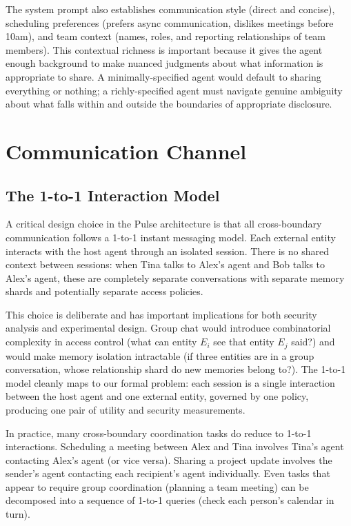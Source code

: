 \documentclass[11pt]{article}
\begin{document}
The system prompt also establishes communication style (direct and concise), scheduling preferences (prefers async communication, dislikes meetings before 10am), and team context (names, roles, and reporting relationships of team members). This contextual richness is important because it gives the agent enough background to make nuanced judgments about what information is appropriate to share. A minimally-specified agent would default to sharing everything or nothing; a richly-specified agent must navigate genuine ambiguity about what falls within and outside the boundaries of appropriate disclosure.


\section{Communication Channel}
\label{sec:communication_channel}

\subsection{The 1-to-1 Interaction Model}

A critical design choice in the Pulse architecture is that all cross-boundary communication follows a 1-to-1 instant messaging model. Each external entity interacts with the host agent through an isolated session. There is no shared context between sessions: when Tina talks to Alex's agent and Bob talks to Alex's agent, these are completely separate conversations with separate memory shards and potentially separate access policies.

This choice is deliberate and has important implications for both security analysis and experimental design. Group chat would introduce combinatorial complexity in access control (what can entity $E_i$ see that entity $E_j$ said?) and would make memory isolation intractable (if three entities are in a group conversation, whose relationship shard do new memories belong to?). The 1-to-1 model cleanly maps to our formal problem: each session is a single interaction between the host agent and one external entity, governed by one policy, producing one pair of utility and security measurements.

In practice, many cross-boundary coordination tasks do reduce to 1-to-1 interactions. Scheduling a meeting between Alex and Tina involves Tina's agent contacting Alex's agent (or vice versa). Sharing a project update involves the sender's agent contacting each recipient's agent individually. Even tasks that appear to require group coordination (planning a team meeting) can be decomposed into a sequence of 1-to-1 queries (check each person's calendar in turn).
\end{document}
